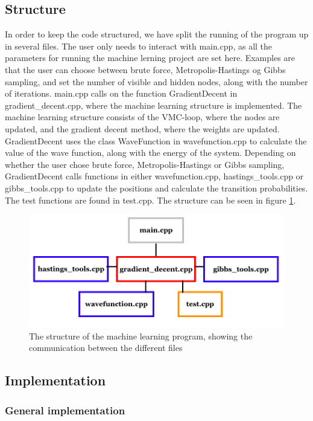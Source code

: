\documentclass[norsk,a4paper,12pt]{article}
\begin{document}
\subsection{Structure}
In order to keep the code structured, we have split the running of the program up in several files. The user only needs to interact with main.cpp, as all the parameters for running the machine lerning project are set here. Examples are that the user can choose between brute force, Metropolis-Hastings og Gibbs sampling, and set the number of visible and hidden nodes, along with the number of iterations. main.cpp calls on the function GradientDecent in gradient\_decent.cpp, where the machine learning structure is implemented. The machine learning structure consists of the VMC-loop, where the nodes are updated, and the gradient decent method, where the weights are updated. GradientDecent uses the class WaveFunction in wavefunction.cpp to calculate the value of the wave function, along with the energy of the system. Depending on whether the user chose brute force, Metropolis-Hastings or Gibbs sampling, GradientDecent calls functions in either wavefunction.cpp, hastings\_tools.cpp or gibbs\_tools.cpp to update the positions and calculate the transition probabilities. The test functions are found in test.cpp. The structure can be seen in figure \ref{fig:program_structure}.

 \begin{figure} [H]
	\centering
	\includegraphics[scale=0.4]{program_structure.png}
	\caption{The structure of the machine learning program, showing the communication between the different files}
	\label{fig:program_structure}
\end{figure}

\subsection{Implementation}

\subsubsection{General implementation}
\lstset{basicstyle=\scriptsize}
\end{document}
